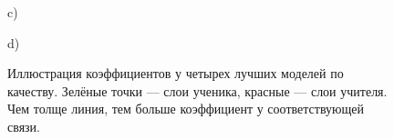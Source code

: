 \documentclass[14]{article}
\begin{document}
\begin{figure}
\begin{minipage}[h]{0.35\linewidth}
  \end{minipage}
  \vfill
  \begin{minipage}[h]{0.35\linewidth}
     c) \\
  \end{minipage}
  \hfill
  \begin{minipage}[h]{0.35\linewidth}
     d) \\
  \end{minipage}
  \caption{Иллюстрация коэффициентов у четырех лучших моделей по качеству. Зелёные точки --- слои ученика, красные --- слои учителя. Чем толще линия, тем больше коэффициент у соответствующей связи.}
  \label{ris:tiny_lambdas}
\end{figure}
\end{document}
